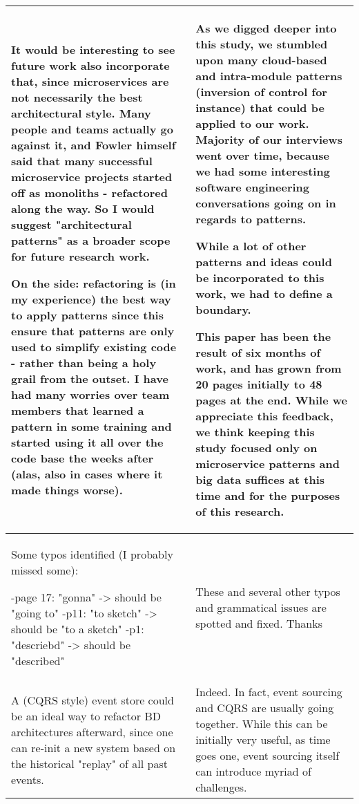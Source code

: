 \documentclass{article}
\begin{document}
\begin{longtable}{|p{7cm}|p{7cm}|}
    It would be interesting to see future work also incorporate that, since microservices are not necessarily the best architectural style. Many people and teams actually go against it, and Fowler himself said that many successful microservice projects started off as monoliths - refactored along the way.  So I would suggest "architectural patterns" as a broader scope for future research work.

    On the side: refactoring is (in my experience) the best way to apply patterns since this ensure that patterns are only used to simplify existing code -  rather than being a holy grail from the outset. I  have had many worries over team members that learned a pattern in some training and started using it all over the code base the weeks after (alas, also in cases where it made things worse). & 
    
    As we digged deeper into this study, we stumbled upon many cloud-based and intra-module patterns (inversion of control for instance) that could be applied to our work. Majority of our interviews went over time, because we had some interesting software engineering conversations going on in regards to patterns. 
    
    While a lot of other patterns and ideas could be incorporated to this work, we had to define a boundary.

    This paper has been the result of six months of work, and has grown from 20 pages initially to 48 pages at the end. While we appreciate this feedback, we think keeping this study focused only on microservice patterns and big data suffices at this time and for the purposes of this research. 
    
   
    
    
    \\ \hline
    \rule[-1.5ex]{0pt}{4.5ex} Some typos identified (I probably missed some):

    -page 17: "gonna" -> should be "going to"
    -p11: "to sketch" -> should be "to a sketch"
    -p1: "descriebd" -> should be "described" & These and several other typos and grammatical issues are spotted and fixed. Thanks \\ \hline

    \rule[-1.5ex]{0pt}{4.5ex} A (CQRS style) event store could be an ideal way to refactor BD architectures afterward, since one can re-init a new system based on the historical "replay" of all past events. & Indeed. In fact, event sourcing and CQRS are usually going together. While this can be initially very useful, as time goes one, event sourcing itself can introduce myriad of challenges.


\end{longtable}
\end{document}
